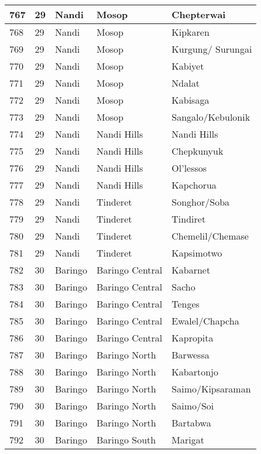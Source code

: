 \begin{table}[!ht]
\begin{tabular}{|l|l|l|l|l|}
        767 & 29 & Nandi & Mosop & Chepterwai \\ \hline
        768 & 29 & Nandi & Mosop & Kipkaren \\ \hline
        769 & 29 & Nandi & Mosop & Kurgung/ Surungai \\ \hline
        770 & 29 & Nandi & Mosop & Kabiyet \\ \hline
        771 & 29 & Nandi & Mosop & Ndalat \\ \hline
        772 & 29 & Nandi & Mosop & Kabisaga \\ \hline
        773 & 29 & Nandi & Mosop & Sangalo/Kebulonik \\ \hline
        774 & 29 & Nandi & Nandi Hills & Nandi Hills \\ \hline
        775 & 29 & Nandi & Nandi Hills & Chepkunyuk \\ \hline
        776 & 29 & Nandi & Nandi Hills & Ol’lessos \\ \hline
        777 & 29 & Nandi & Nandi Hills & Kapchorua \\ \hline
        778 & 29 & Nandi & Tinderet & Songhor/Soba \\ \hline
        779 & 29 & Nandi & Tinderet & Tindiret \\ \hline
        780 & 29 & Nandi & Tinderet & Chemelil/Chemase \\ \hline
        781 & 29 & Nandi & Tinderet & Kapsimotwo \\ \hline
        782 & 30 & Baringo & Baringo Central & Kabarnet \\ \hline
        783 & 30 & Baringo & Baringo Central & Sacho \\ \hline
        784 & 30 & Baringo & Baringo Central & Tenges \\ \hline
        785 & 30 & Baringo & Baringo Central & Ewalel/Chapcha \\ \hline
        786 & 30 & Baringo & Baringo Central & Kapropita \\ \hline
        787 & 30 & Baringo & Baringo North & Barwessa \\ \hline
        788 & 30 & Baringo & Baringo North & Kabartonjo \\ \hline
        789 & 30 & Baringo & Baringo North & Saimo/Kipsaraman \\ \hline
        790 & 30 & Baringo & Baringo North & Saimo/Soi \\ \hline
        791 & 30 & Baringo & Baringo North & Bartabwa \\ \hline
        792 & 30 & Baringo & Baringo South & Marigat \\ \hline

\end{tabular}
\end{table}
